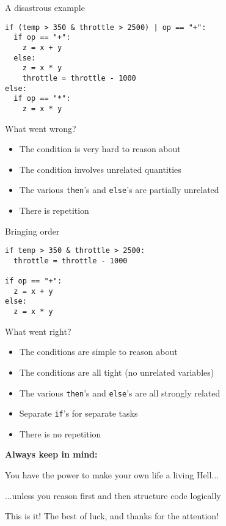 \documentclass{beamer}
\begin{document}
\begin{frame}[fragile]{A disastrous example}
\begin{lstlisting}[frame=shadowbox,basicstyle=\ttfamily\tiny]
if (temp > 350 & throttle > 2500) | op == "+":
  if op == "+":
    z = x + y
  else:
    z = x * y
    throttle = throttle - 1000
else:
  if op == "*":
    z = x * y
\end{lstlisting}

What went wrong? \\

\pause

\begin{itemize}
\item The condition is very hard to reason about
\item The condition involves unrelated quantities
\item The various \texttt{then}'s and \texttt{else}'s are partially unrelated
\item There is repetition
\end{itemize}
\end{frame}

\begin{frame}[fragile]{Bringing order}
\begin{lstlisting}[frame=shadowbox,basicstyle=\ttfamily\tiny]
if temp > 350 & throttle > 2500:
  throttle = throttle - 1000

if op == "+":
  z = x + y
else:
  z = x * y
\end{lstlisting}

What went right? \\

\pause

\begin{itemize}
\item The conditions are simple to reason about
\item The conditions are all tight (no unrelated variables)
\item The various \texttt{then}'s and \texttt{else}'s are all strongly related
\item Separate \texttt{if}'s for separate tasks
\item There is no repetition
\end{itemize}
\end{frame}

\begin{slide}{
\item \textbf{Always keep in mind:}
\item You have the power to make your own life a living Hell...
\pause
\item ...unless you reason first and then structure code logically
}\end{slide}

\begin{frame}{This is it!}
\center
\fontsize{18pt}{7.2}\selectfont
The best of luck, and thanks for the attention!
\end{frame}
\end{document}
